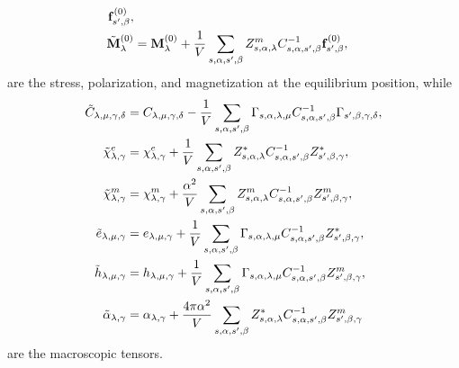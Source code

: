 \documentclass[12pt,a4paper]{article}
\begin{document}
{\begin{align}
{\bf f}^{(0)}_{s',\beta}, \\
\tilde {\bf M}^{(0)}_\lambda&= {\bf M}^{(0)}_\lambda +{1\over V}
\sum_{s,\alpha,s',\beta} Z^m_{s,\alpha,\lambda} C^{-1}_{s,\alpha,s',\beta}
{\bf f}^{(0)}_{s',\beta},
\end{align}
are the stress, polarization, and magnetization at the equilibrium position,
while
\begin{align}
\tilde C_{\lambda,\mu,\gamma,\delta}&= C_{\lambda,\mu,\gamma,\delta}
-{1\over V}\sum_{s,\alpha,s',\beta} \Gamma_{s,\alpha,\lambda,\mu}
C^{-1}_{s,\alpha,s',\beta}  \Gamma_{s',\beta,\gamma,\delta},\\
\tilde \chi^e_{\lambda,\gamma}&= \chi^e_{\lambda,\gamma} 
+{1 \over V} \sum_{s,\alpha,s',\beta} Z^*_{s,\alpha,\lambda}
C^{-1}_{s,\alpha,s',\beta}  Z^*_{s',\beta,\gamma},\\
\tilde \chi^m_{\lambda,\gamma}&= \chi^m_{\lambda,\gamma} 
+{\alpha^2 \over V} \sum_{s,\alpha,s',\beta} Z^m_{s,\alpha,\lambda}
C^{-1}_{s,\alpha,s',\beta}  Z^m_{s',\beta,\gamma}, \\
\tilde e_{\lambda,\mu,\gamma}&= e_{\lambda,\mu,\gamma}
+{1\over V}\sum_{s,\alpha,s',\beta} \Gamma_{s,\alpha,\lambda,\mu}
C^{-1}_{s,\alpha,s',\beta} Z^*_{s',\beta,\gamma},\\
\tilde h_{\lambda,\mu,\gamma}&= h_{\lambda,\mu,\gamma}
+{1\over V}\sum_{s,\alpha,s',\beta} \Gamma_{s,\alpha,\lambda,\mu}
C^{-1}_{s,\alpha,s',\beta}  Z^m_{s',\beta,\gamma},\\
\tilde \alpha_{\lambda,\gamma}&= \alpha_{\lambda,\gamma}
+{4 \pi \alpha^2 \over V}\sum_{s,\alpha,s',\beta} Z^*_{s,\alpha,\lambda}
C^{-1}_{s,\alpha,s',\beta}  Z^m_{s',\beta,\gamma}
\end{align}
are the macroscopic tensors.
}
\\
\end{document}
